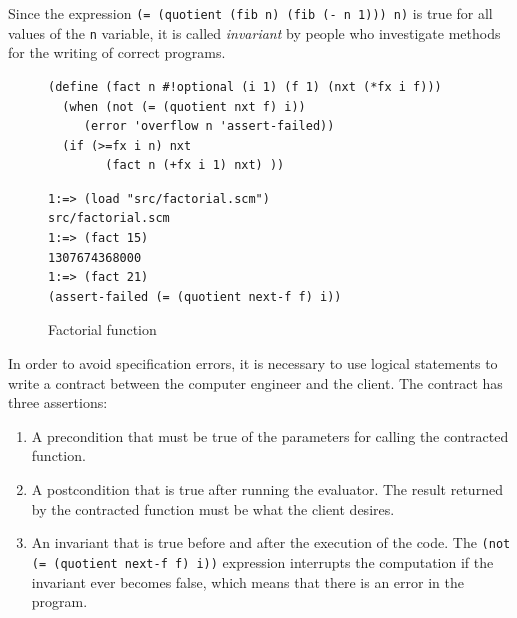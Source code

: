 \documentclass[a4paper,12pt]{book}
\newenvironment{fmpage}[1]
           {\begin{lrbox}{\fmbox}\begin{minipage}{#1}}
           {\end{minipage}\end{lrbox}\fbox{\usebox{\fmbox}}}
\begin{document}
Since the
expression \verb|(= (quotient (fib n) (fib (- n 1))) n)|
is true for all values of the \verb|n| variable,
it is called {\em invariant} by people
who investigate methods for the writing of correct
programs.

\begin{figure}[!h]
\begin{fmpage}{0.95\linewidth}
\begin{verbatim}
(define (fact n #!optional (i 1) (f 1) (nxt (*fx i f)))
  (when (not (= (quotient nxt f) i))
     (error 'overflow n 'assert-failed))
  (if (>=fx i n) nxt
        (fact n (+fx i 1) nxt) ))
\end{verbatim}
\end{fmpage}

\begin{fmpage}{0.8\linewidth}
\begin{verbatim}
1:=> (load "src/factorial.scm")
src/factorial.scm
1:=> (fact 15)
1307674368000
1:=> (fact 21)
(assert-failed (= (quotient next-f f) i))
\end{verbatim}
\end{fmpage}
\caption{Factorial function}
\label{loop-invariant/fact}
\end{figure}

In order to avoid specification errors,
it is necessary to use logical statements
to write a contract between the computer
engineer and the client. The contract has
three assertions:
\begin{enumerate}
\item A precondition that must be true
of the parameters for calling the contracted function.
\item A postcondition that is true after running
the evaluator. The result returned by the
contracted function must be what the client desires.
\item An invariant that is
true before and after the execution of the code.  
The \verb|(not (= (quotient next-f f) i))|
expression interrupts the computation if
the invariant ever becomes false, which
means that there is an error in the program.
\end{enumerate}
\end{document}
